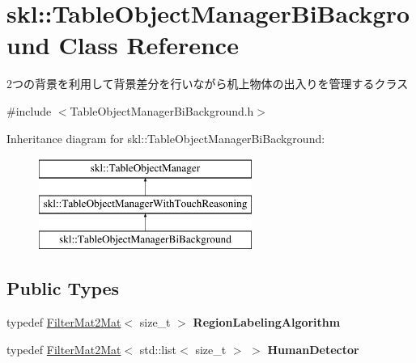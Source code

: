\hypertarget{classskl_1_1_table_object_manager_bi_background}{}\section{skl\+:\+:Table\+Object\+Manager\+Bi\+Background Class Reference}
\label{classskl_1_1_table_object_manager_bi_background}


2つの背景を利用して背景差分を行いながら机上物体の出入りを管理するクラス  




{\ttfamily \#include $<$Table\+Object\+Manager\+Bi\+Background.\+h$>$}

Inheritance diagram for skl\+:\+:Table\+Object\+Manager\+Bi\+Background\+:\begin{figure}[H]
\begin{center}
\leavevmode
\includegraphics[height=3.000000cm]{classskl_1_1_table_object_manager_bi_background}
\end{center}
\end{figure}
\subsection*{Public Types}
\begin{DoxyCompactItemize}
\item 
\hypertarget{classskl_1_1_table_object_manager_bi_background_abe053e1676cc38136d416703f45e08b5}{}\label{classskl_1_1_table_object_manager_bi_background_abe053e1676cc38136d416703f45e08b5} 
typedef \hyperlink{classskl_1_1_filter_mat2_mat}{Filter\+Mat2\+Mat}$<$ size\+\_\+t $>$ {\bfseries Region\+Labeling\+Algorithm}
\item 
\hypertarget{classskl_1_1_table_object_manager_bi_background_a1576c40dbd074e438ad99a0eb4e3c519}{}\label{classskl_1_1_table_object_manager_bi_background_a1576c40dbd074e438ad99a0eb4e3c519} 
typedef \hyperlink{classskl_1_1_filter_mat2_mat}{Filter\+Mat2\+Mat}$<$ std\+::list$<$ size\+\_\+t $>$ $>$ {\bfseries Human\+Detector}
\end{DoxyCompactItemize}
